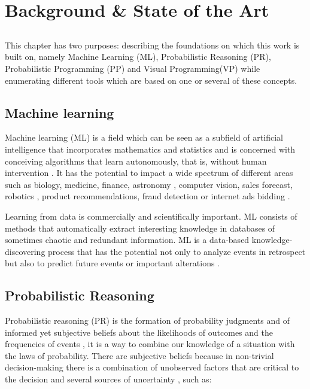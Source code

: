 \chapter{Background \& State of the Art} \label{chap:sota}

\section*{}

This chapter has two purposes: describing the foundations on which this work
is built on, namely Machine Learning (ML), Probabilistic Reasoning (PR),
Probabilistic Programming (PP) and
Visual Programming(VP) while enumerating different tools which are based
on one or several of these concepts.

\section{Machine learning}

Machine learning (ML) is a field which can be seen as a subfield of artificial
intelligence that incorporates mathematics and statistics and is concerned
with conceiving algorithms that learn autonomously, that is, without human
intervention \cite{mlbrit}\cite{mlnot}.
It has the potential to impact a wide spectrum of
different areas such as biology, medicine, finance, astronomy
\cite{Amatriain:2013:BDU:2541176.2514691}, computer vision, sales forecast,
robotics \cite{intml}, product recommendations, fraud detection or
internet ads bidding \cite{SciPy}.

Learning from data is commercially and scientifically important. ML consists of
methods that automatically extract interesting knowledge in databases of sometimes chaotic and
redundant information. ML is a data-based knowledge-discovering process that
has the potential not only to analyze events in retrospect but also to predict
future events or important alterations \cite{mapt}.

\section{Probabilistic Reasoning}

Probabilistic reasoning (PR) is the formation of probability judgments and of
informed yet subjective beliefs about the likelihoods of outcomes and the frequencies of
events \cite{Lassiter2012}, it is a way to combine our knowledge of a situation
with the laws of probability. There are subjective beliefs because in non-trivial
decision-making there is a combination of unobserved factors that are critical to the decision
and several sources of uncertainty \cite{reas}, such as:

